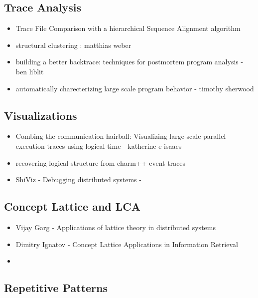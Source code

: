 \subsection{Trace Analysis}


\begin{itemize}
\item Trace File Comparison with a hierarchical Sequence Alignment algorithm \cite{weber-seqAlign}
\item structural clustering : matthias weber \cite{weberStructural}
\item building a better backtrace: techniques for postmortem program analysis - ben liblit \cite{liblit02}
\item automatically charecterizing large scale program behavior - timothy sherwood \cite{sherwood02}
\end{itemize}


\subsection{Visualizations}


\begin{itemize}
\item Combing the communication hairball: Visualizing large-scale parallel execution traces using logical time - katherine e isaacs \cite{ravel}
\item recovering logical structure from charm++ event traces \cite{charmVis}
\item ShiViz - Debugging distributed systems - \cite{shiviz}
\end{itemize}



\subsection{Concept Lattice and LCA}


\begin{itemize}
\item Vijay Garg - Applications of lattice theory in distributed systems

\item Dimitry Ignatov \cite{ignatov} - Concept Lattice Applications in Information Retrieval

\item \cite{clbook} \cite{clconst} \cite{bender05} \cite{latticeForDistConst} 
\end{itemize}

\subsection{Repetitive Patterns}




